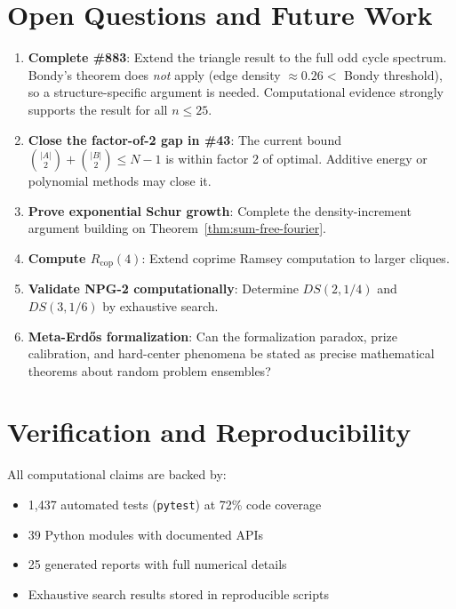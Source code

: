 \documentclass[11pt,a4paper]{article}
\theoremstyle{definition}
\theoremstyle{remark}
\begin{document}
\section{Open Questions and Future Work}

\begin{enumerate}
\item \textbf{Complete \#883}: Extend the triangle result to the full odd
cycle spectrum. Bondy's theorem does \emph{not} apply (edge density $\approx 0.26
< $ Bondy threshold), so a structure-specific argument is needed. Computational
evidence strongly supports the result for all $n \leq 25$.

\item \textbf{Close the factor-of-2 gap in \#43}: The current bound
$\binom{|A|}{2} + \binom{|B|}{2} \leq N-1$ is within factor 2 of optimal.
Additive energy or polynomial methods may close it.

\item \textbf{Prove exponential Schur growth}: Complete the density-increment
argument building on Theorem~\ref{thm:sum-free-fourier}.

\item \textbf{Compute $R_{\mathrm{cop}}(4)$}: Extend coprime Ramsey
computation to larger cliques.

\item \textbf{Validate NPG-2 computationally}: Determine $DS(2, 1/4)$
and $DS(3, 1/6)$ by exhaustive search.

\item \textbf{Meta-Erd\H{o}s formalization}: Can the formalization paradox,
prize calibration, and hard-center phenomena be stated as precise
mathematical theorems about random problem ensembles?
\end{enumerate}

\section{Verification and Reproducibility}

All computational claims are backed by:
\begin{itemize}[nosep]
\item 1,437 automated tests (\texttt{pytest}) at 72\% code coverage
\item 39 Python modules with documented APIs
\item 25 generated reports with full numerical details
\item Exhaustive search results stored in reproducible scripts
\end{itemize}
\end{document}
